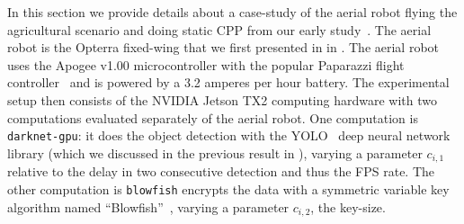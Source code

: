 In this section we provide details about a case-study of the aerial robot flying the agricultural scenario and doing static CPP from our early study~\citep{seewald2020mechanical}. The aerial robot is the Opterra fixed-wing that we first presented in  in . The aerial robot uses the Apogee v1.00 microcontroller with the popular Paparazzi flight controller~\citep{papa} and is powered by a 3.2 amperes per hour battery. The experimental setup then consists of the NVIDIA Jetson TX2 computing hardware with two computations evaluated separately of the aerial robot. One computation is {\small\tt darknet-gpu}: it does the object detection with the YOLO~\citep{redmon2016you} deep neural network library (which we discussed in the previous result in ), varying a parameter $c_{i,1}$ relative to the delay in two consecutive detection and thus the FPS rate. The other computation is {\small\tt blowfish} encrypts the data with a symmetric variable key algorithm named ``Blowfish''~\citep{schneier1993description}, varying a parameter $c_{i,2}$, the key-size.

